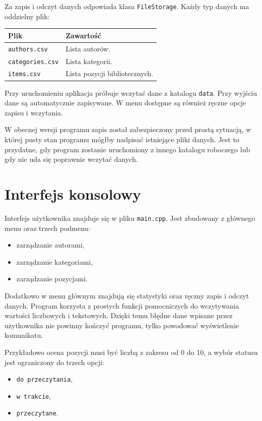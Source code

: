 \documentclass[12pt,a4paper]{article}
\begin{document}
Za zapis i odczyt danych odpowiada klasa \texttt{FileStorage}. Każdy typ danych ma
oddzielny plik:

\begin{longtable}{|p{4cm}|p{10cm}|}
\hline
\textbf{Plik} & \textbf{Zawartość} \\
\hline
\texttt{authors.csv} & Lista autorów. \\
\hline
\texttt{categories.csv} & Lista kategorii. \\
\hline
\texttt{items.csv} & Lista pozycji bibliotecznych. \\
\hline
\end{longtable}

Przy uruchomieniu aplikacja próbuje wczytać dane z katalogu \texttt{data}. Przy wyjściu
dane są automatycznie zapisywane. W menu dostępne są również ręczne opcje zapisu
i wczytania.

W obecnej wersji programu zapis został zabezpieczony przed prostą sytuacją, w której
pusty stan programu mógłby nadpisać istniejące pliki danych. Jest to przydatne, gdy
program zostanie uruchomiony z innego katalogu roboczego lub gdy nie uda się poprawnie
wczytać danych.

\section{Interfejs konsolowy}

Interfejs użytkownika znajduje się w pliku \texttt{main.cpp}. Jest zbudowany z głównego
menu oraz trzech podmenu:

\begin{itemize}
    \item zarządzanie autorami,
    \item zarządzanie kategoriami,
    \item zarządzanie pozycjami.
\end{itemize}

Dodatkowo w menu głównym znajdują się statystyki oraz ręczny zapis i odczyt danych.
Program korzysta z prostych funkcji pomocniczych do wczytywania wartości liczbowych
i tekstowych. Dzięki temu błędne dane wpisane przez użytkownika nie powinny kończyć
programu, tylko powodować wyświetlenie komunikatu.

Przykładowo ocena pozycji musi być liczbą z zakresu od 0 do 10, a wybór statusu jest
ograniczony do trzech opcji:

\begin{itemize}
    \item \texttt{do przeczytania},
    \item \texttt{w trakcie},
    \item \texttt{przeczytane}.
\end{itemize}
\end{document}
